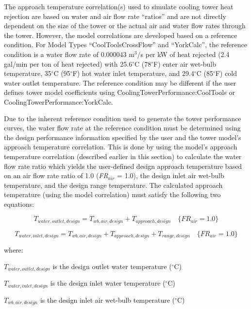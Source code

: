 The approach temperature correlation(s) used to simulate cooling tower heat rejection are based on water and air flow rate ``ratios'' and are not directly dependent on the size of the tower or the actual air and water flow rates through the tower. However, the model correlations are developed based on a reference condition. For Model Types ``CoolToolsCrossFlow'' and ``YorkCalc'', the reference condition is a water flow rate of 0.000043 m\(^{3}\)/s per kW of heat rejected (2.4 gal/min per ton of heat rejected) with 25.6\(^{\circ}\)C (78\(^{\circ}\)F) enter air wet-bulb temperature, 35\(^{\circ}\)C (95\(^{\circ}\)F) hot water inlet temperature, and 29.4\(^{\circ}\)C (85\(^{\circ}\)F) cold water outlet temperature. The reference condition may be different if the user defines tower model coefficients using CoolingTowerPerformance:CoolTools or CoolingTowerPerformance:YorkCalc.

Due to the inherent reference condition used to generate the tower performance curves, the water flow rate at the reference condition must be determined using the design performance information specified by the user and the tower model's approach temperature correlation. This is done by using the model's approach temperature correlation (described earlier in this section) to calculate the water flow rate ratio which yields the user-defined design approach temperature based on an air flow rate ratio of 1.0 (\emph{FR\(_{air}\)} = 1.0), the design inlet air wet-bulb temperature, and the design range temperature. The calculated approach temperature (using the model correlation) must satisfy the following two equations:

\begin{equation}
{T_{water,outlet,design}} = {T_{wb,air,design}} + {T_{approach,design}}\quad \{ F{R_{air}} = 1.0\}
\end{equation}

\begin{equation}
{T_{water,inlet,design}} = {T_{wb,air,design}} + {T_{approach,design}} + {T_{range,design}}\quad \{ F{R_{air}} = 1.0\}
\end{equation}

where:

\({T_{water,outlet,design}}\) is the design outlet water temperature (\(^{\circ}\)C)

\({T_{water,inlet,design}}\) is the design inlet water temperature (\(^{\circ}\)C)

\({T_{wb,air,design}}\) is the design inlet air wet-bulb temperature (\(^{\circ}\)C)


